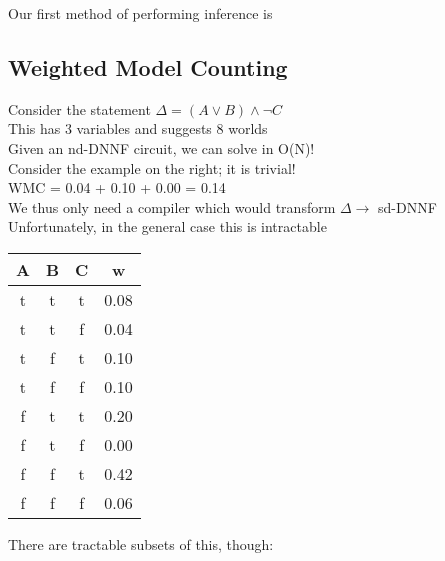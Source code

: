 \documentclass[../../lecture_notes.tex]{subfiles}
\begin{document}
\begin{center}\begin{minipage}{0.7\linewidth}
\noindent Our first method of performing inference is
\subsection*{Weighted Model Counting}
\noindent Consider the statement $\Delta = (A \lor B) \land\neg C$\\ 
	\indent This has 3 variables and suggests 8 worlds\\
	\indent Given an nd-DNNF circuit, we can solve in O(N)!\\
	\indent Consider the example on the right; it is trivial! \\
	\indent WMC = 0.04 + 0.10 + 0.00 = 0.14\\
	\indent We thus only need a compiler which would transform $\Delta \rightarrow$ sd-DNNF\\
	\indent Unfortunately, in the general case this is intractable\\
\end{minipage}%
\begin{minipage}{0.3\linewidth}\begin{tabular}{ | c | c | c | c |}\hline
	A & B & C & w\\\hline
	t & t & t & 0.08\\
	t & t & f & 0.04\\
	t & f & t & 0.10\\
	t & f & f & 0.10\\
	f & t & t & 0.20\\
	f & t & f & 0.00\\
	f & f & t & 0.42\\
	f & f & f & 0.06\\\hline
\end{tabular}\end{minipage}\end{center}
	
There are tractable subsets of this, though:
\end{document}
